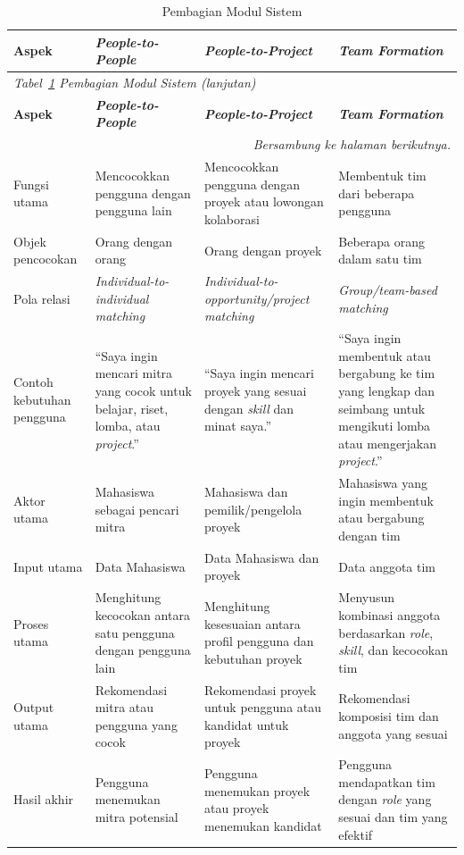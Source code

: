\begin{longtable}{p{2.5cm} p{3.5cm} p{3.5cm} p{\dimexpr\linewidth-9.5cm-8\tabcolsep\relax}}
  \caption{Pembagian Modul Sistem}
  \label{tab:pembagian-modul} \\
  \toprule
  \textbf{Aspek} & \textbf{\emph{People-to-People}} & \textbf{\emph{People-to-Project}} & \textbf{\emph{Team Formation}} \\
  \midrule
  \endfirsthead
  \multicolumn{4}{l}{\small\textit{Tabel~\ref{tab:pembagian-modul} Pembagian Modul Sistem (lanjutan)}} \\
  \toprule
  \textbf{Aspek} & \textbf{\emph{People-to-People}} & \textbf{\emph{People-to-Project}} & \textbf{\emph{Team Formation}} \\
  \midrule
  \endhead
  \bottomrule
  \multicolumn{4}{r}{\textit{Bersambung ke halaman berikutnya.}} \\
  \endfoot
  \bottomrule
  \endlastfoot
  Fungsi utama & Mencocokkan pengguna dengan pengguna lain & Mencocokkan pengguna dengan proyek atau lowongan kolaborasi & Membentuk tim dari beberapa pengguna \\
  \midrule
  Objek pencocokan & Orang dengan orang & Orang dengan proyek & Beberapa orang dalam satu tim \\
  \midrule
  Pola relasi & \emph{Individual-to-individual matching} & \emph{Individual-to-opportunity/project matching} & \emph{Group/team-based matching} \\
  \midrule
  Contoh kebutuhan pengguna & ``Saya ingin mencari mitra yang cocok untuk belajar, riset, lomba, atau \emph{project}.'' & ``Saya ingin mencari proyek yang sesuai dengan \emph{skill} dan minat saya.'' & ``Saya ingin membentuk atau bergabung ke tim yang lengkap dan seimbang untuk mengikuti lomba atau mengerjakan \emph{project}.'' \\
  \midrule
  Aktor utama & Mahasiswa sebagai pencari mitra & Mahasiswa dan pemilik/pengelola proyek & Mahasiswa yang ingin membentuk atau bergabung dengan tim \\
  \midrule
  Input utama & Data Mahasiswa & Data Mahasiswa dan proyek & Data anggota tim \\
  \midrule
  Proses utama & Menghitung kecocokan antara satu pengguna dengan pengguna lain & Menghitung kesesuaian antara profil pengguna dan kebutuhan proyek & Menyusun kombinasi anggota berdasarkan \emph{role}, \emph{skill}, dan kecocokan tim \\
  \midrule
  Output utama & Rekomendasi mitra atau pengguna yang cocok & Rekomendasi proyek untuk pengguna atau kandidat untuk proyek & Rekomendasi komposisi tim dan anggota yang sesuai \\
  \midrule
  Hasil akhir & Pengguna menemukan mitra potensial & Pengguna menemukan proyek atau proyek menemukan kandidat & Pengguna mendapatkan tim dengan \emph{role} yang sesuai dan tim yang efektif \\
\end{longtable}

